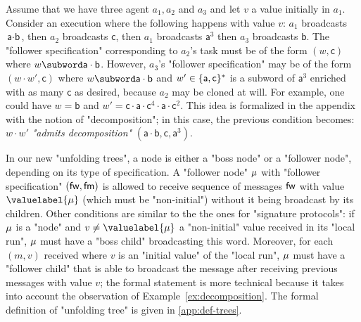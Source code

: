 \begin{example}
\label{ex:decomposition}
Assume that we have three agent $a_1,a_2$ and $a_3$ and let $v$ a value initially in $a_1$. Consider an execution where the following happens with value $v$: $a_1$ broadcasts $\textsf{a} \cdot \textsf{b}$, then $a_2$ broadcasts $\textsf{c}$, then $a_1$ broadcasts $\textsf{a}^3$ then $a_3$ broadcasts $\textsf{b}$. The "follower specification" corresponding to $a_2$'s task must be of the form $(w, \textsf{c})$ where $w \subword \textsf{a} \cdot \textsf{b}$. However, $a_3$'s "follower specification" may be of the form $(w \cdot w', \textsf{c})$ where $w \subword \textsf{a} \cdot \textsf{b}$ and $w' \in \{\textsf{a},\textsf{c}\}^*$ is a subword of $\textsf{a}^3$ enriched with as many $\textsf{c}$ as desired, because $a_2$ may be cloned at will. For example, one could have $w= \textsf{b} $ and $w' = \textsf{c} \cdot \textsf{a} \cdot \textsf{c}^4 \cdot \textsf{a} \cdot \textsf{c}^2$. This idea is formalized in the appendix with the notion of "decomposition"; in this case, the previous condition becomes: $w \cdot w'$ \emph{"admits decomposition"} $(\textsf{a} \cdot \textsf{b}, \textsf{c}, \textsf{a}^3)$.   
\end{example}

In our new "unfolding trees", a node is either a "boss node" or a "follower node", depending on its type of specification. A "follower node" $\mu$ with "follower specification" $(\mathsf{fw}, \mathsf{fm})$ is allowed to receive sequence of messages $\mathsf{fw}$ with value $\valuelabel{\node}$ (which must be "non-initial") without it being broadcast by its children. Other conditions are similar to the the ones for "signature protocols": if $\mu$ is a "node" and $v \ne \valuelabel{\node}$ a "non-initial" value received in its "local run", $\mu$ must have a "boss child" broadcasting this word. Moreover, for each $(m,v)$ received where $v$ is an "initial value" of the "local run", $\mu$ must have a "follower child" that is able to broadcast the message after receiving previous messages with value $v$; the formal statement is more technical because it takes into account the observation of Example~\ref{ex:decomposition}. 
The formal definition of "unfolding tree" is given in \cref{app:def-trees}.


